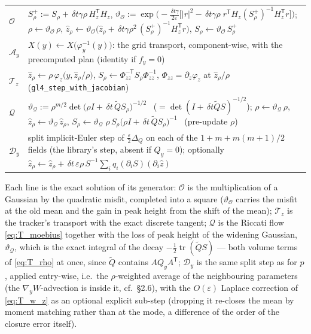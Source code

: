\documentclass[11pt,a4paper]{article}
\newcommand{\tr}{\operatorname{tr}}
\newcommand{\T}{^{\mathsf T}}
\newcommand{\zh}{\hat{z}}
\newcommand{\zr}{\hat{z}_{\rho}}   %
\newcommand{\Sr}{S_{\rho}}          %
\newcommand{\eps}{\varepsilon}
\newcommand{\abs}[1]{\left\lvert #1 \right\rvert}
\newcommand{\gy}{\nabla_{\!y}}
\newcommand{\dt}{\,\delta t}
\theoremstyle{plain}
\theoremstyle{definition}
\theoremstyle{remark}
\begin{document}
\begin{center}\small
\begin{tabular}{@{}l p{11.6cm}@{}}
\toprule
$\mathcal O$ & $S_\rho^+ := \Sr + \dt\gamma\rho\,H_z\T H_z$, \quad
  $\vartheta_{\mathcal O} := \exp\!\Big(-\frac{\dt\gamma}{2\eps}\Big[\abs r^2 - \dt\gamma\rho\; r\T H_z(S_\rho^+)^{-1}H_z\T r\Big]\Big)$; \newline
  $\rho\leftarrow\vartheta_{\mathcal O}\,\rho$, \quad
  $\zr\leftarrow\vartheta_{\mathcal O}\big(\zr + \dt\gamma\rho^2\,(S_\rho^+)^{-1}H_z\T r\big)$, \quad
  $\Sr\leftarrow\vartheta_{\mathcal O}\,S_\rho^+$ \\[3pt]
$\mathcal A_y$ & $X(y)\leftarrow X\big(\varphi_y^{-1}(y)\big)$: the grid transport, component-wise, with the precomputed plan (identity if $f_y=0$) \\[3pt]
$\mathcal T_z$ & $\zr\leftarrow\rho\,\varphi_z\big(y,\zr/\rho\big)$, \quad $\Sr\leftarrow\Phi_{zz}^{-\mathsf T}\Sr\Phi_{zz}^{-1}$, \quad $\Phi_{zz}=\partial_z\varphi_z$ at $\zr/\rho$ (\texttt{gl4\_step\_with\_jacobian}) \\[3pt]
$\mathcal Q$ & $\vartheta_{\mathcal Q} := \rho^{m/2}\det\big(\rho I+\dt\,\tilde Q\Sr\big)^{-1/2}$ \ ($=\det(I+\dt\tilde QS)^{-1/2}$); \newline
  $\rho\leftarrow\vartheta_{\mathcal Q}\,\rho$, \quad $\zr\leftarrow\vartheta_{\mathcal Q}\,\zr$, \quad
  $\Sr\leftarrow\vartheta_{\mathcal Q}\;\rho\,\Sr\big(\rho I+\dt\,\tilde Q\Sr\big)^{-1}$ \ (pre-update $\rho$) \\[3pt]
$\mathcal D_y$ & split implicit-Euler step of $\tfrac\eps2\Delta_Q$ on each of the $1+m+m(m+1)/2$ fields (the library's step, absent if $Q_y=0$); optionally $\zr\leftarrow\zr + \dt\,\eps\rho\,S^{-1}\sum_iq_i(\partial_iS)(\partial_i\zh)$ \\
\bottomrule
\end{tabular}
\end{center}

Each line is the exact solution of its generator: $\mathcal O$ is the multiplication of a Gaussian by the quadratic misfit, completed into a square ($\vartheta_{\mathcal O}$ carries the misfit at the old mean and the gain in peak height from the shift of the mean); $\mathcal T_z$ is the tracker's transport with the exact discrete tangent; $\mathcal Q$ is the Riccati flow \eqref{eq:T_moebius} together with the loss of peak height of the widening Gaussian, $\vartheta_{\mathcal Q}$, which is the exact integral of the decay $-\tfrac12\tr(\tilde QS)$ --- both volume terms of \eqref{eq:T_rho} at once, since $\tilde Q$ contains $AQ_yA\T$; $\mathcal D_y$ is the same split step as for $p$, applied entry-wise, i.e.\ the $\rho$-weighted average of the neighbouring parameters (the $\gy W$-advection is inside it, cf.\ \S2.6), with the $O(\eps)$ Laplace correction of \eqref{eq:T_w_z} as an optional explicit sub-step (dropping it re-closes the mean by moment matching rather than at the mode, a difference of the order of the closure error itself).
\end{document}
